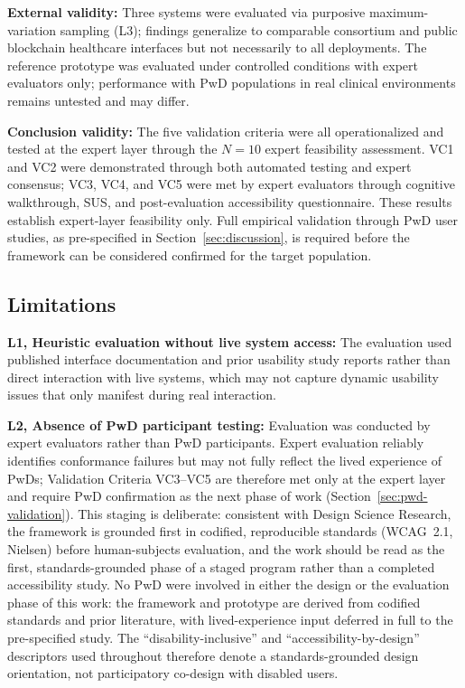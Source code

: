\documentclass[journal,onecolumn]{IEEEtran}
\begin{document}
\textbf{External validity:} Three systems were evaluated via purposive maximum-variation sampling (L3); findings generalize to comparable consortium and public blockchain healthcare interfaces but not necessarily to all deployments. The reference prototype was evaluated under controlled conditions with expert evaluators only; performance with PwD populations in real clinical environments remains untested and may differ.

\textbf{Conclusion validity:} The five validation criteria were all operationalized and tested at the expert layer through the $N=10$ expert feasibility assessment. VC1 and VC2 were demonstrated through both automated testing and expert consensus; VC3, VC4, and VC5 were met by expert evaluators through cognitive walkthrough, SUS, and post-evaluation accessibility questionnaire. These results establish expert-layer feasibility only. Full empirical validation through PwD user studies, as pre-specified in Section~\ref{sec:discussion}, is required before the framework can be considered confirmed for the target population.

\subsection{Limitations}

\textbf{L1, Heuristic evaluation without live system access:} The evaluation used published interface documentation and prior usability study reports rather than direct interaction with live systems, which may not capture dynamic usability issues that only manifest during real interaction.

\textbf{L2, Absence of PwD participant testing:} Evaluation was conducted by expert evaluators rather than PwD participants. Expert evaluation reliably identifies conformance failures but may not fully reflect the lived experience of PwDs; Validation Criteria VC3--VC5 are therefore met only at the expert layer and require PwD confirmation as the next phase of work (Section~\ref{sec:pwd-validation}). This staging is deliberate: consistent with Design Science Research, the framework is grounded first in codified, reproducible standards (WCAG~2.1, Nielsen) before human-subjects evaluation, and the work should be read as the first, standards-grounded phase of a staged program rather than a completed accessibility study. No PwD were involved in either the design or the evaluation phase of this work: the framework and prototype are derived from codified standards and prior literature, with lived-experience input deferred in full to the pre-specified study. The ``disability-inclusive'' and ``accessibility-by-design'' descriptors used throughout therefore denote a standards-grounded design orientation, not participatory co-design with disabled users.
\end{document}
